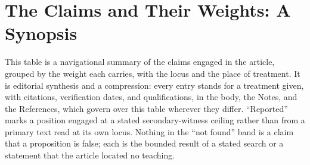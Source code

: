 \section{The Claims and Their Weights: A Synopsis}

This table is a navigational summary of the claims engaged in the article, grouped by the weight each carries, with the locus and the place of treatment. It is editorial synthesis and a compression: every entry stands for a treatment given, with citations, verification dates, and qualifications, in the body, the Notes, and the References, which govern over this table wherever they differ. ``Reported'' marks a position engaged at a stated secondary-witness ceiling rather than from a primary text read at its own locus. Nothing in the ``not found'' band is a claim that a proposition is false; each is the bounded result of a stated search or a statement that the article located no teaching.


